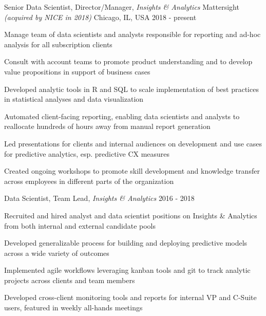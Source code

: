 
\begin{cventries}

 \cventry
    {Senior Data Scientist, Director/Manager, \textit{Insights \& Analytics}} %
    {Mattersight \textit{\textmd{(acquired by NICE in 2018)}}} %
    {Chicago, IL, USA} %
    {2018 - present} %
    {
      \begin{cvitems}
        \item {Manage team of data scientists and analysts responsible for reporting and ad-hoc analysis for all subscription clients}
        \item {Consult with account teams to promote product understanding and to develop value propositions in support of business cases}
        \item {Developed analytic tools in R and SQL to scale implementation of best practices in statistical analyses and data visualization}
        \item {Automated client-facing reporting, enabling data scientists and analysts to reallocate hundreds of hours away from manual report generation}
        \item {Led presentations for clients and internal audiences on development and use cases for predictive analytics, esp. predictive CX measures}
        \item {Created ongoing workshops to promote skill development and knowledge transfer across employees in different parts of the organization}
      \end{cvitems}
      }

  \cventry
    {Data Scientist, Team Lead, \textit{Insights \& Analytics}} %
    {} %
    {} %
    {2016 - 2018} %
    {
      \begin{cvitems}
        \item {Recruited and hired analyst and data scientist positions on Insights \& Analytics from both internal and external candidate pools}
        \item {Developed generalizable process for building and deploying predictive models across a wide variety of outcomes}
        \item {Implemented agile workflows leveraging kanban tools and git to track analytic projects across clients and team members}
        \item{Developed cross-client monitoring tools and reports for internal VP and C-Suite users, featured in weekly all-hands meetings}
      \end{cvitems}
    }


\end{cventries}
